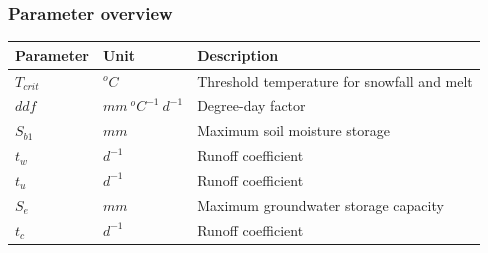 \subsubsection{Parameter overview}
\begin{table}[htbp]
  \centering
    \begin{tabular}{lll}
    \toprule
    Parameter & Unit  & Description \\
    \midrule
    $T_{crit}$ & $^oC$ & Threshold temperature for snowfall and melt \\
    $ddf$ & $mm~^oC^{-1}~d^{-1}$ & Degree-day factor \\
    $S_{b1}$ & $mm$  & Maximum soil moisture storage \\
    $t_w$ & $d^{-1}$ & Runoff coefficient \\
    $t_u$ & $d^{-1}$ & Runoff coefficient \\
    $S_e$ & $mm$  & Maximum groundwater storage capacity \\
    $t_c$ & $d^{-1}$ & Runoff coefficient \\
    \bottomrule
    \end{tabular}%
  \label{tab:addlabel}%
\end{table}%

